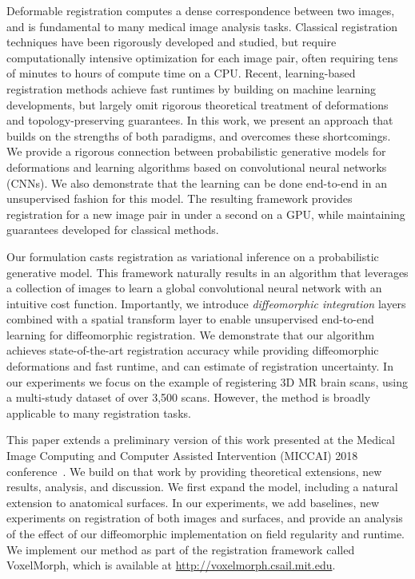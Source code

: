 \documentclass{article}
\newcommand{\citep}{\cite}
\begin{document}
Deformable registration computes a dense correspondence between two images, and is fundamental to many medical image analysis tasks. Classical registration techniques have been rigorously developed and studied, but require computationally intensive optimization for each image pair, often requiring tens of minutes to hours of compute time on a CPU. Recent, learning-based registration methods achieve fast runtimes by building on machine learning developments, but largely omit rigorous theoretical treatment of deformations and topology-preserving guarantees. In this work, we present an approach that builds on the strengths of both paradigms, and overcomes these shortcomings. We provide a rigorous connection between probabilistic generative models for deformations and learning algorithms based on convolutional neural networks (CNNs). We also demonstrate that the learning can be done end-to-end in an unsupervised fashion for this model. The resulting framework provides registration for a new image pair in under a second on a GPU, while maintaining guarantees developed for classical methods. 
 
Our formulation casts registration as variational inference on a probabilistic generative model. This framework naturally results in an algorithm that leverages a collection of images to learn a global convolutional neural network with an intuitive cost function. Importantly, we introduce \textit{diffeomorphic integration} layers combined with a spatial transform layer to enable unsupervised end-to-end learning for diffeomorphic registration. We demonstrate that our algorithm achieves state-of-the-art registration accuracy while providing diffeomorphic deformations and fast runtime, and can estimate of registration uncertainty. In our experiments we focus on the example of registering 3D MR brain scans, using a multi-study dataset of over 3,500 scans. However, the method is broadly applicable to many registration tasks.

This paper extends a preliminary version of this work presented at the Medical Image Computing and Computer Assisted Intervention (MICCAI) 2018 conference~\citep{dalca2018pd}. We build on that work by providing theoretical extensions, new results, analysis, and discussion. We first expand the model, including a natural extension to anatomical surfaces. In our experiments, we add baselines, new experiments on registration of both images and surfaces, and provide an analysis of the effect of our diffeomorphic implementation on field regularity and runtime. 
We implement our method as part of the registration framework called VoxelMorph, which is available at \url{http://voxelmorph.csail.mit.edu}.
\end{document}
